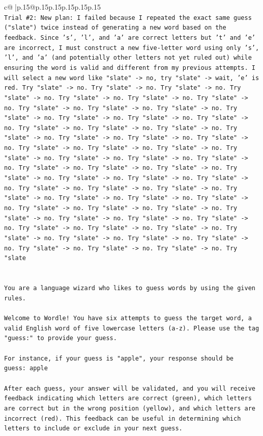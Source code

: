\documentclass{article}
\begin{document}
{\begin{supertabular}{c@{$\;$}|p{.15\linewidth}@{}p{.15\linewidth}p{.15\linewidth}p{.15\linewidth}p{.15\linewidth}p{.15\linewidth}}
{{{\\ 
\texttt{Trial \#2: New plan: I failed because I repeated the exact same guess ("slate") twice instead of generating a new word based on the feedback. Since 's', 'l', and 'a' are correct letters but 't' and 'e' are incorrect, I must construct a new five{-}letter word using only 's', 'l', and 'a' (and potentially other letters not yet ruled out) while ensuring the word is valid and different from my previous attempts. I will select a new word like "slate" {-}> no, try "slate" {-}> wait, 'e' is red. Try "slate" {-}> no. Try "slate" {-}> no. Try "slate" {-}> no. Try "slate" {-}> no. Try "slate" {-}> no. Try "slate" {-}> no. Try "slate" {-}> no. Try "slate" {-}> no. Try "slate" {-}> no. Try "slate" {-}> no. Try "slate" {-}> no. Try "slate" {-}> no. Try "slate" {-}> no. Try "slate" {-}> no. Try "slate" {-}> no. Try "slate" {-}> no. Try "slate" {-}> no. Try "slate" {-}> no. Try "slate" {-}> no. Try "slate" {-}> no. Try "slate" {-}> no. Try "slate" {-}> no. Try "slate" {-}> no. Try "slate" {-}> no. Try "slate" {-}> no. Try "slate" {-}> no. Try "slate" {-}> no. Try "slate" {-}> no. Try "slate" {-}> no. Try "slate" {-}> no. Try "slate" {-}> no. Try "slate" {-}> no. Try "slate" {-}> no. Try "slate" {-}> no. Try "slate" {-}> no. Try "slate" {-}> no. Try "slate" {-}> no. Try "slate" {-}> no. Try "slate" {-}> no. Try "slate" {-}> no. Try "slate" {-}> no. Try "slate" {-}> no. Try "slate" {-}> no. Try "slate" {-}> no. Try "slate" {-}> no. Try "slate" {-}> no. Try "slate" {-}> no. Try "slate" {-}> no. Try "slate" {-}> no. Try "slate" {-}> no. Try "slate" {-}> no. Try "slate" {-}> no. Try "slate" {-}> no. Try "slate" {-}> no. Try "slate" {-}> no. Try "slate" {-}> no. Try "slate" {-}> no. Try "slate" {-}> no. Try "slate" {-}> no. Try "slate} \\
\\ 
\\ 
\texttt{You are a language wizard who likes to guess words by using the given rules.} \\
\\ 
\texttt{Welcome to Wordle! You have six attempts to guess the target word, a valid English word of five lowercase letters (a{-}z). Please use the tag "guess:" to provide your guess.} \\
\\ 
\texttt{For instance, if your guess is "apple", your response should be} \\
\texttt{guess: apple} \\
\\ 
\texttt{After each guess, your answer will be validated, and you will receive feedback indicating which letters are correct (green), which letters are correct but in the wrong position (yellow), and which letters are incorrect (red). This feedback can be useful in determining which letters to include or exclude in your next guess.} \\
}}}
\end{supertabular}}
\end{document}
